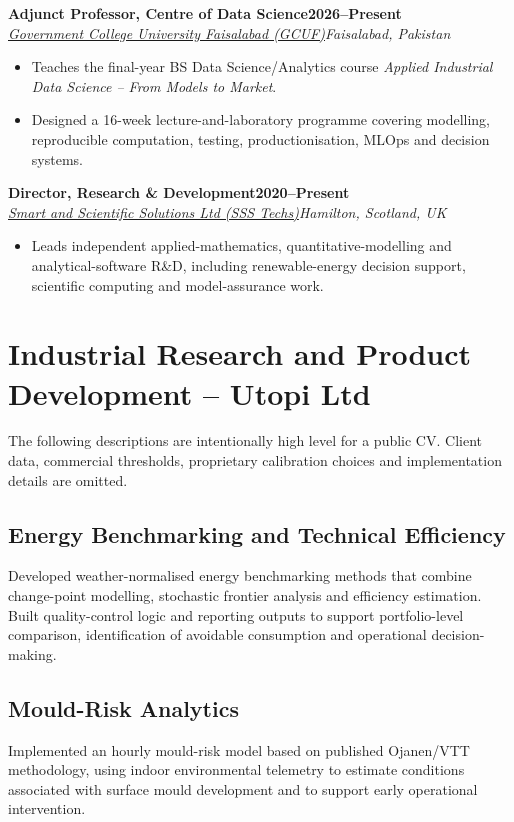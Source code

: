\documentclass[10pt,a4paper]{article}
\newcommand{\cvrole}[4]{\textbf{#1}\hfill\textbf{#2}\\[-1pt]\textit{#3}\hfill\textit{#4}\par}
\begin{document}
\cvrole{Adjunct Professor, Centre of Data Science}{2026--Present}{\href{https://gcuf.edu.pk/faculties/physical-science/data-science/}{Government College University Faisalabad (GCUF)}}{Faisalabad, Pakistan}
\begin{itemize}
\item Teaches the final-year BS Data Science/Analytics course \textit{Applied Industrial Data Science -- From Models to Market}.
\item Designed a 16-week lecture-and-laboratory programme covering modelling, reproducible computation, testing, productionisation, MLOps and decision systems.
\end{itemize}

\cvrole{Director, Research \& Development}{2020--Present}{\href{https://www.ssstechs.com/}{Smart and Scientific Solutions Ltd (SSS Techs)}}{Hamilton, Scotland, UK}
\begin{itemize}
\item Leads independent applied-mathematics, quantitative-modelling and analytical-software R\&D, including renewable-energy decision support, scientific computing and model-assurance work.
\end{itemize}

\section{Industrial Research and Product Development -- Utopi Ltd}
The following descriptions are intentionally high level for a public CV. Client data, commercial thresholds, proprietary calibration choices and implementation details are omitted.

\subsection{Energy Benchmarking and Technical Efficiency}
Developed weather-normalised energy benchmarking methods that combine change-point modelling, stochastic frontier analysis and efficiency estimation. Built quality-control logic and reporting outputs to support portfolio-level comparison, identification of avoidable consumption and operational decision-making.

\subsection{Mould-Risk Analytics}
Implemented an hourly mould-risk model based on published Ojanen/VTT methodology, using indoor environmental telemetry to estimate conditions associated with surface mould development and to support early operational intervention.
\end{document}
